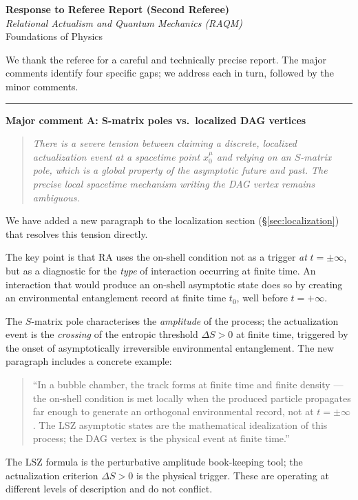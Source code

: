 \documentclass[11pt]{article}
\newcommand{\refereequote}[1]{%
  \begin{quote}\itshape\small #1\end{quote}}
\begin{document}
\noindent
\textbf{Response to Referee Report (Second Referee)}\\
\textit{Relational Actualism and Quantum Mechanics (RAQM)}\\
Foundations of Physics

\bigskip\noindent
We thank the referee for a careful and technically precise report. The
major comments identify four specific gaps; we address each in turn,
followed by the minor comments.

\bigskip\hrule\bigskip

\noindent\textbf{Major comment A: S-matrix poles vs.\ localized DAG vertices}

\refereequote{There is a severe tension between claiming a discrete, localized
actualization event at a spacetime point $x_0^\mu$ and relying on an
$S$-matrix pole, which is a global property of the asymptotic future and
past. The precise local spacetime mechanism writing the DAG vertex remains
ambiguous.}

We have added a new paragraph to the localization section (\S\ref{sec:localization})
that resolves this tension directly.

The key point is that RA uses the on-shell condition not as a trigger
\emph{at} $t = \pm\infty$, but as a diagnostic for the \emph{type} of
interaction occurring at finite time. An interaction that would produce an
on-shell asymptotic state does so by creating an environmental entanglement
record at finite time $t_0$, well before $t = +\infty$.

The $S$-matrix pole characterises the \emph{amplitude} of the process; the
actualization event is the \emph{crossing} of the entropic threshold
$\Delta S > 0$ at finite time, triggered by the onset of asymptotically
irreversible environmental entanglement. The new paragraph includes a
concrete example:

\begin{quote}
``In a bubble chamber, the track forms at finite time and finite density ---
the on-shell condition is met locally when the produced particle propagates
far enough to generate an orthogonal environmental record, not at $t = \pm\infty$.
The LSZ asymptotic states are the mathematical idealization of this process;
the DAG vertex is the physical event at finite time.''
\end{quote}

The LSZ formula is the perturbative amplitude book-keeping tool; the
actualization criterion $\Delta S > 0$ is the physical trigger. These are
operating at different levels of description and do not conflict.
\end{document}
